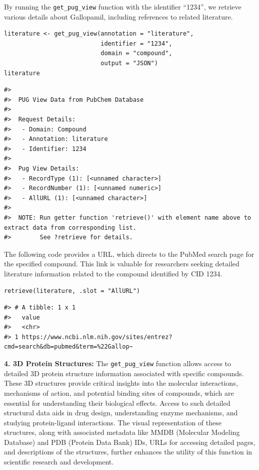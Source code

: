 By running the \texttt{get\_pug\_view} function with the identifier ``1234'', we retrieve various details about Gallopamil, including references to related literature.

\begin{verbatim}
literature <- get_pug_view(annotation = "literature", 
                           identifier = "1234", 
                           domain = "compound", 
                           output = "JSON")
literature
\end{verbatim}

\begin{verbatim}
#> 
#>  PUG View Data from PubChem Database 
#> 
#>  Request Details:  
#>   - Domain: Compound
#>   - Annotation: literature
#>   - Identifier: 1234
#> 
#>  Pug View Details: 
#>   - RecordType (1): [<unnamed character>] 
#>   - RecordNumber (1): [<unnamed numeric>] 
#>   - AllURL (1): [<unnamed character>] 
#> 
#>  NOTE: Run getter function 'retrieve()' with element name above to extract data from corresponding list. 
#>        See ?retrieve for details.
\end{verbatim}

The following code provides a URL, which directs to the PubMed search page for the specified compound. This link is valuable for researchers seeking detailed literature information related to the compound identified by CID 1234.

\begin{verbatim}
retrieve(literature, .slot = "AllURL")
\end{verbatim}

\begin{verbatim}
#> # A tibble: 1 x 1
#>   value                                                                         
#>   <chr>                                                                         
#> 1 https://www.ncbi.nlm.nih.gov/sites/entrez?cmd=search&db=pubmed&term=%22Gallop~
\end{verbatim}

\textbf{4. 3D Protein Structures:} The \texttt{get\_pug\_view} function allows access to detailed 3D protein structure information associated with specific compounds. These 3D structures provide critical insights into the molecular interactions, mechanisms of action, and potential binding sites of compounds, which are essential for understanding their biological effects. Access to such detailed structural data aids in drug design, understanding enzyme mechanisms, and studying protein-ligand interactions. The visual representation of these structures, along with associated metadata like MMDB (Molecular Modeling Database) and PDB (Protein Data Bank) IDs, URLs for accessing detailed pages, and descriptions of the structures, further enhances the utility of this function in scientific research and development.

